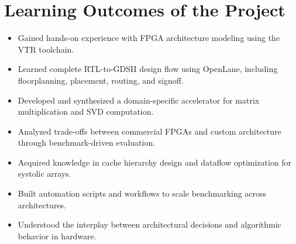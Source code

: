 \section{Learning Outcomes of the Project}
\begin{itemize}
	\item Gained hands-on experience with FPGA architecture modeling using the VTR toolchain.
	\item Learned complete RTL-to-GDSII design flow using OpenLane, including floorplanning, placement, routing, and signoff.
	\item Developed and synthesized a domain-specific accelerator for matrix multiplication and SVD computation.
	\item Analyzed trade-offs between commercial FPGAs and custom architecture through benchmark-driven evaluation.
	\item Acquired knowledge in cache hierarchy design and dataflow optimization for systolic arrays.
	\item Built automation scripts and workflows to scale benchmarking across architectures.
	\item Understood the interplay between architectural decisions and algorithmic behavior in hardware.
\end{itemize}


\begin{comment}
	\begin{itemize}
		\item List the learning outcomes here
		\item List a minimum of 5 learning outcomes
	\end{itemize}
\end{comment}


